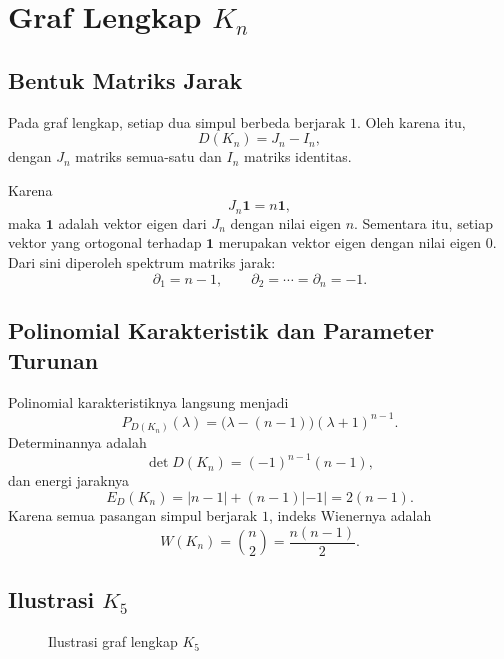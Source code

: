 \documentclass[12pt,a4paper]{article}
\begin{document}
\section{Graf Lengkap $K_n$}

\subsection{Bentuk Matriks Jarak}

Pada graf lengkap, setiap dua simpul berbeda berjarak $1$. Oleh karena itu,
\[
  D(K_n)=J_n-I_n,
\]
dengan $J_n$ matriks semua-satu dan $I_n$ matriks identitas.

Karena
\[
  J_n\mathbf{1}=n\mathbf{1},
\]
maka $\mathbf{1}$ adalah vektor eigen dari $J_n$ dengan nilai eigen $n$. Sementara itu, setiap vektor yang ortogonal terhadap $\mathbf{1}$ merupakan vektor eigen dengan nilai eigen $0$. Dari sini diperoleh spektrum matriks jarak:
\[
  \partial_1=n-1,
  \qquad
  \partial_2=\cdots=\partial_n=-1.
\]

\subsection{Polinomial Karakteristik dan Parameter Turunan}

Polinomial karakteristiknya langsung menjadi
\[
  P_{D(K_n)}(\lambda)
  =\bigl(\lambda-(n-1)\bigr)(\lambda+1)^{n-1}.
\]
Determinannya adalah
\[
  \det D(K_n)=(-1)^{n-1}(n-1),
\]
dan energi jaraknya
\[
  E_D(K_n)=|n-1|+(n-1)|-1|=2(n-1).
\]
Karena semua pasangan simpul berjarak $1$, indeks Wienernya adalah
\[
  W(K_n)=\binom{n}{2}=\frac{n(n-1)}{2}.
\]

\subsection{Ilustrasi $K_5$}

\begin{figure}[h!]
  \centering
  \caption{Ilustrasi graf lengkap $K_5$}
  \label{fig:k5}
\end{figure}
\end{document}
